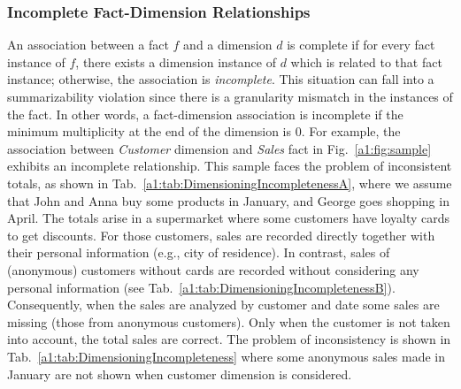 \subsubsection{Incomplete Fact-Dimension Relationships} An
association between a fact $f$ and a dimension $d$ is complete if
for every fact instance of $f$, there exists a dimension instance of
$d$ which is related to that fact instance; otherwise, the
association is \emph{incomplete}. This situation can fall into a
summarizability violation since there is a granularity mismatch in
the instances of the fact. In other words, a fact-dimension
association is incomplete if the minimum multiplicity at the end of
the dimension is $0$. For example, the association between
\emph{Customer} dimension and \emph{Sales} fact in
Fig.~\ref{a1:fig:sample} exhibits an incomplete relationship. This
sample faces the problem of inconsistent totals, as shown in
Tab.~\ref{a1:tab:DimensioningIncompletenessA}, where we assume that
John and Anna buy some products in January, and George goes shopping
in April. The totals arise in a supermarket where some customers
have loyalty cards to get discounts. For those customers, sales are
recorded directly together with their personal information (e.g.,
city of residence). In contrast, sales of (anonymous) customers
without cards are recorded without considering any personal
information (see Tab.~\ref{a1:tab:DimensioningIncompletenessB}).
Consequently, when the sales are analyzed by customer and date some
sales are missing (those from anonymous customers). Only when the
customer is not taken into account, the total sales are correct. The
problem of inconsistency is shown in
Tab.~\ref{a1:tab:DimensioningIncompleteness} where some anonymous
sales made in January are not shown when customer dimension is
considered.

\begin{table}
\centering \caption{Inconsistent totals for sales due to
incompleteness}
     \label{a1:tab:DimensioningIncompleteness}
 \qquad\qquad {}
\end{table}



